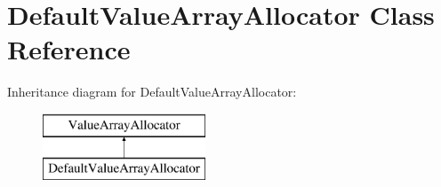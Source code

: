 \hypertarget{class_default_value_array_allocator}{\section{Default\-Value\-Array\-Allocator Class Reference}
\label{class_default_value_array_allocator}
}
Inheritance diagram for Default\-Value\-Array\-Allocator\-:\begin{figure}[H]
\begin{center}
\leavevmode
\includegraphics[height=2.000000cm]{class_default_value_array_allocator}
\end{center}
\end{figure}
